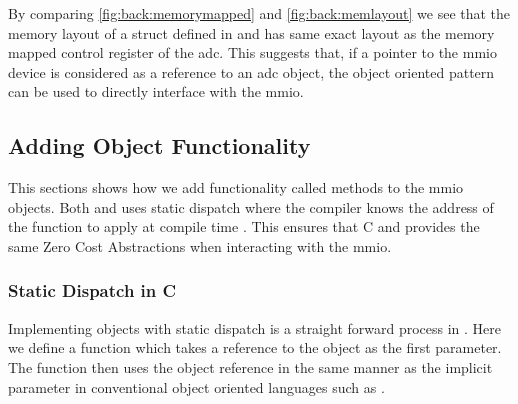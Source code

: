 By comparing \autoref{fig:back:memorymapped} and \autoref{fig:back:memlayout} we see that the memory layout of a struct defined in {\rust} and {\C} has same exact layout as the memory mapped control register of the \gls{adc}.
This suggests that, if a pointer to the \gls{mmio} device is considered as a reference to an \gls{adc} object, the object oriented pattern can be used to directly interface with the \gls{mmio}.

\subsection{Adding Object Functionality}

This sections shows how we add functionality called methods to the \gls{mmio} objects.
Both {\C} and {\rust} uses static dispatch where the compiler knows the address of the function to apply at compile time .
This ensures that C and {\rust} provides the same Zero Cost Abstractions when interacting with the \gls{mmio}.

\subsubsection{Static Dispatch in C}

Implementing objects with static dispatch is a straight forward process in {\C}.
Here we define a function which takes a reference to the object as the first parameter.
The function then uses the object reference in the same manner as the implicit  parameter in conventional object oriented languages such as {\Java}.

